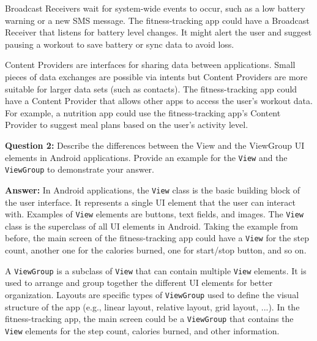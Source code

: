 \documentclass{usireport}
\begin{document}
Broadcast Receivers wait for system-wide events to occur, such as a low battery warning or a new SMS message. The fitness-tracking app could have a Broadcast Receiver that listens for battery level changes. It might alert the user and suggest pausing a workout to save battery or sync data to avoid loss.

Content Providers are interfaces for sharing data between applications. Small pieces of data exchanges are possible via intents but Content Providers are more suitable for larger data sets (such as contacts). The fitness-tracking app could have a Content Provider that allows other apps to access the user's workout data. For example, a nutrition app could use the fitness-tracking app's Content Provider to suggest meal plans based on the user's activity level.

\bigbreak

\textbf{Question 2:} Describe the differences between the View and the ViewGroup UI elements in Android applications. Provide an example for the \texttt{View} and the \texttt{ViewGroup} to demonstrate your answer.

\textbf{Answer:} In Android applications, the \texttt{View} class is the basic building block of the user interface. It represents a single UI element that the user can interact with. Examples of \texttt{View} elements are buttons, text fields, and images. The \texttt{View} class is the superclass of all UI elements in Android.
Taking the example from before, the main screen of the fitness-tracking app could have a \texttt{View} for the step count, another one for the calories burned, one for start/stop button, and so on.

A \texttt{ViewGroup} is a subclass of \texttt{View} that can contain multiple \texttt{View} elements. It is used to arrange and group together the different UI elements for better organization. Layouts are specific types of \texttt{ViewGroup} used to define the visual structure of the app (e.g., linear layout, relative layout, grid layout, ...). In the fitness-tracking app, the main screen could be a \texttt{ViewGroup} that contains the \texttt{View} elements for the step count, calories burned, and other information.
\end{document}
